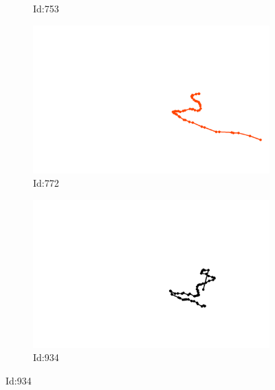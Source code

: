 \documentclass[12pt,twoside]{report}
\begin{document}
\begin{figure}
\begin{subfigure}[b]{0.20\textwidth}
\caption{Id:753}
\end{subfigure}
\begin{subfigure}[b]{0.20\textwidth}
\centering
\includegraphics[width=\textwidth]{../../trajectories/772.png}
\caption{Id:772}
\end{subfigure}
\begin{subfigure}[b]{0.20\textwidth}
\centering
\includegraphics[width=\textwidth]{../../trajectories/934.png}
\caption{Id:934}
\end{subfigure}
\end{figure}
\end{document}

